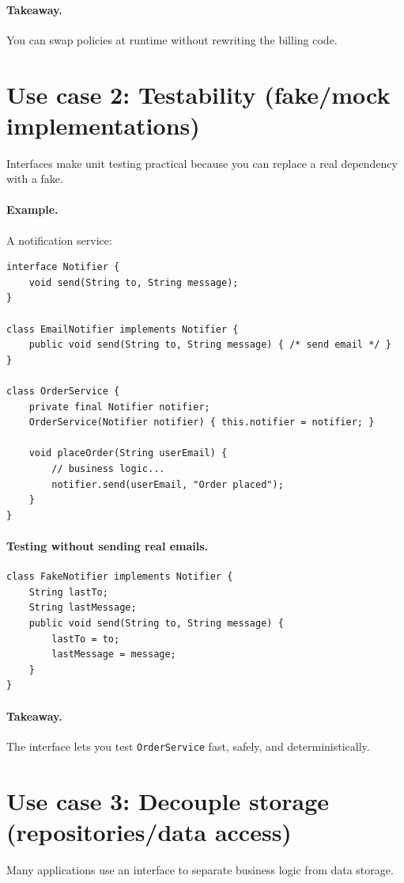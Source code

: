 \documentclass[11pt]{article}
\begin{document}
\paragraph{Takeaway.} You can swap policies at runtime without rewriting the billing code.

\section*{Use case 2: Testability (fake/mock implementations)}
Interfaces make unit testing practical because you can replace a real dependency with a fake.

\paragraph{Example.} A notification service:
\begin{lstlisting}
interface Notifier {
    void send(String to, String message);
}

class EmailNotifier implements Notifier {
    public void send(String to, String message) { /* send email */ }
}

class OrderService {
    private final Notifier notifier;
    OrderService(Notifier notifier) { this.notifier = notifier; }

    void placeOrder(String userEmail) {
        // business logic...
        notifier.send(userEmail, "Order placed");
    }
}
\end{lstlisting}

\paragraph{Testing without sending real emails.}
\begin{lstlisting}
class FakeNotifier implements Notifier {
    String lastTo;
    String lastMessage;
    public void send(String to, String message) {
        lastTo = to;
        lastMessage = message;
    }
}
\end{lstlisting}

\paragraph{Takeaway.} The interface lets you test \texttt{OrderService} fast, safely, and deterministically.

\section*{Use case 3: Decouple storage (repositories/data access)}
Many applications use an interface to separate business logic from data storage.
\end{document}
